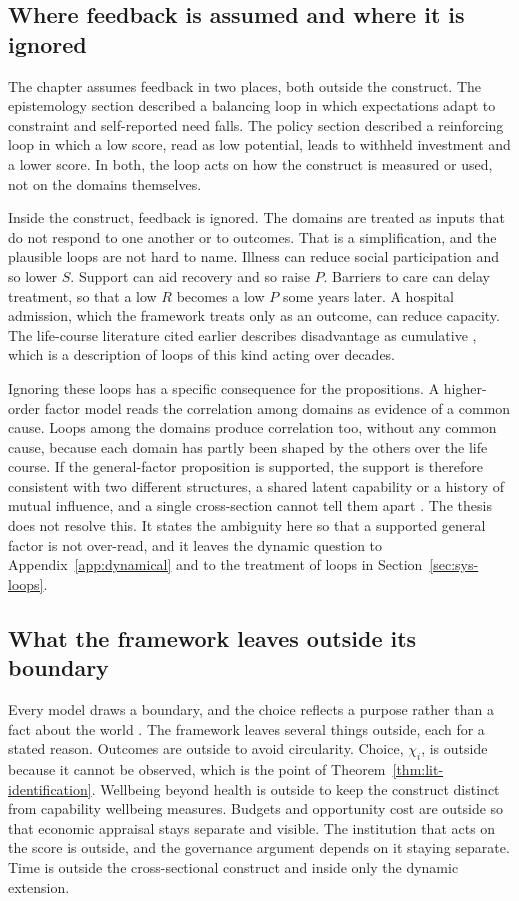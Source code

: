 \subsection{Where feedback is assumed and where it is ignored}

The chapter assumes feedback in two places, both outside the construct. The epistemology section described a balancing loop in which expectations adapt to constraint and self-reported need falls. The policy section described a reinforcing loop in which a low score, read as low potential, leads to withheld investment and a lower score. In both, the loop acts on how the construct is measured or used, not on the domains themselves.

Inside the construct, feedback is ignored. The domains are treated as inputs that do not respond to one another or to outcomes. That is a simplification, and the plausible loops are not hard to name. Illness can reduce social participation and so lower $S$. Support can aid recovery and so raise $P$. Barriers to care can delay treatment, so that a low $R$ becomes a low $P$ some years later. A hospital admission, which the framework treats only as an outcome, can reduce capacity. The life-course literature cited earlier describes disadvantage as cumulative \citep{marmot_2005,who_sdh_2008}, which is a description of loops of this kind acting over decades.

Ignoring these loops has a specific consequence for the propositions. A higher-order factor model reads the correlation among domains as evidence of a common cause. Loops among the domains produce correlation too, without any common cause, because each domain has partly been shaped by the others over the life course. If the general-factor proposition is supported, the support is therefore consistent with two different structures, a shared latent capability or a history of mutual influence, and a single cross-section cannot tell them apart \citep{sterman_2000}. The thesis does not resolve this. It states the ambiguity here so that a supported general factor is not over-read, and it leaves the dynamic question to Appendix~\ref{app:dynamical} and to the treatment of loops in Section~\ref{sec:sys-loops}.

\subsection{What the framework leaves outside its boundary}

Every model draws a boundary, and the choice reflects a purpose rather than a fact about the world \citep{checkland_1981}. The framework leaves several things outside, each for a stated reason. Outcomes are outside to avoid circularity. Choice, $\chi_i$, is outside because it cannot be observed, which is the point of Theorem~\ref{thm:lit-identification}. Wellbeing beyond health is outside to keep the construct distinct from capability wellbeing measures. Budgets and opportunity cost are outside so that economic appraisal stays separate and visible. The institution that acts on the score is outside, and the governance argument depends on it staying separate. Time is outside the cross-sectional construct and inside only the dynamic extension.

